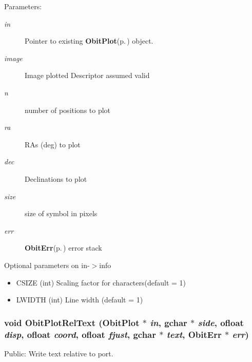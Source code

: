 \begin{Desc}
\item[Parameters:]
\begin{description}
\item[{\em in}]Pointer to existing {\bf Obit\-Plot}{\rm (p.\,\pageref{structObitPlot})} object. \item[{\em image}]Image plotted Descriptor assumed valid \item[{\em n}]number of positions to plot \item[{\em ra}]RAs (deg) to plot \item[{\em dec}]Declinations to plot \item[{\em size}]size of symbol in pixels \item[{\em err}]{\bf Obit\-Err}{\rm (p.\,\pageref{structObitErr})} error stack\end{description}
\end{Desc}
Optional parameters on in-$>$info \begin{itemize}
\item CSIZE (int) Scaling factor for characters(default = 1) \item LWIDTH (int) Line width (default = 1) \end{itemize}
\subsubsection{\setlength{\rightskip}{0pt plus 5cm}void Obit\-Plot\-Rel\-Text ({\bf Obit\-Plot} $\ast$ {\em in}, gchar $\ast$ {\em side}, {\bf ofloat} {\em disp}, {\bf ofloat} {\em coord}, {\bf ofloat} {\em fjust}, gchar $\ast$ {\em text}, {\bf Obit\-Err} $\ast$ {\em err})}\label{ObitPlot_8c_a26}


Public: Write text relative to port. 

